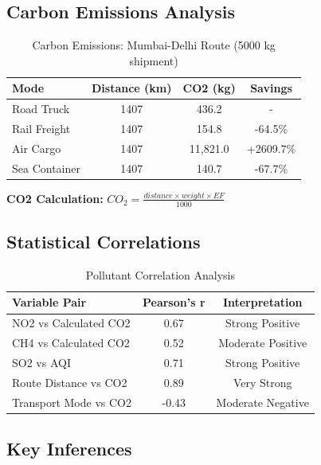 \documentclass[11pt,a4paper]{article}
\begin{document}
\subsection{Carbon Emissions Analysis}

\begin{table}[H]
\centering
\begin{tabular}{|l|c|c|c|}
\hline
\textbf{Mode} & \textbf{Distance (km)} & \textbf{CO2 (kg)} & \textbf{Savings} \\
\hline
Road Truck & 1407 & 436.2 & - \\
Rail Freight & 1407 & 154.8 & -64.5\% \\
Air Cargo & 1407 & 11,821.0 & +2609.7\% \\
Sea Container & 1407 & 140.7 & -67.7\% \\
\hline
\end{tabular}
\caption{Carbon Emissions: Mumbai-Delhi Route (5000 kg shipment)}
\end{table}

\textbf{CO2 Calculation:} $CO_2 = \frac{distance \times weight \times EF}{1000}$

\subsection{Statistical Correlations}

\begin{table}[H]
\centering
\begin{tabular}{|l|c|c|}
\hline
\textbf{Variable Pair} & \textbf{Pearson's r} & \textbf{Interpretation} \\
\hline
NO2 vs Calculated CO2 & 0.67 & Strong Positive \\
CH4 vs Calculated CO2 & 0.52 & Moderate Positive \\
SO2 vs AQI & 0.71 & Strong Positive \\
Route Distance vs CO2 & 0.89 & Very Strong \\
Transport Mode vs CO2 & -0.43 & Moderate Negative \\
\hline
\end{tabular}
\caption{Pollutant Correlation Analysis}
\end{table}

\subsection{Key Inferences}
\end{document}

